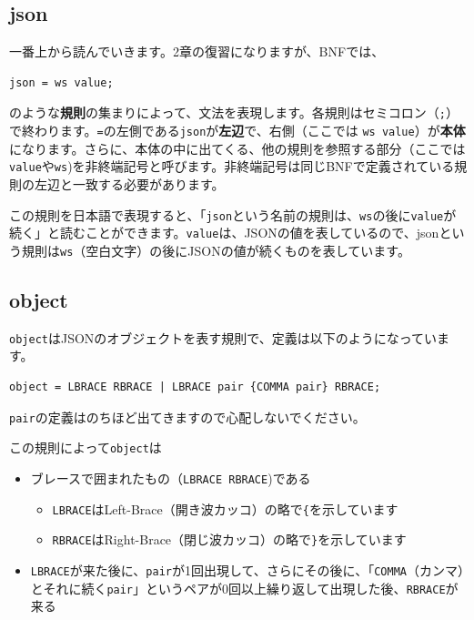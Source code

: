 \hypertarget{chapter3-json}{%
\subsection{json}\label{chapter3-json}}

一番上から読んでいきます。2章の復習になりますが、BNFでは、

\begin{verbatim}
json = ws value;
\end{verbatim}

のような\textbf{規則}の集まりによって、文法を表現します。各規則はセミコロン（\texttt{;}）で終わります。\texttt{=}の左側である\texttt{json}が\textbf{左辺}で、右側（ここでは
\texttt{ws\ value}）が\textbf{本体}になります。さらに、本体の中に出てくる、他の規則を参照する部分（ここでは\texttt{value}や\texttt{ws})を非終端記号と呼びます。非終端記号は同じBNFで定義されている規則の左辺と一致する必要があります。

この規則を日本語で表現すると、「\texttt{json}という名前の規則は、\texttt{ws}の後に\texttt{value}が続く」と読むことができます。\texttt{value}は、JSONの値を表しているので、jsonという規則は\texttt{ws}（空白文字）の後にJSONの値が続くものを表しています。

\hypertarget{chapter3-object}{%
\subsection{object}\label{chapter3-object}}

\texttt{object}はJSONのオブジェクトを表す規則で、定義は以下のようになっています。

\begin{verbatim}
object = LBRACE RBRACE | LBRACE pair {COMMA pair} RBRACE;
\end{verbatim}

\texttt{pair}の定義はのちほど出てきますので心配しないでください。

この規則によって\texttt{object}は

\begin{itemize}
\tightlist
\item
  ブレースで囲まれたもの（\texttt{LBRACE\ RBRACE})である

  \begin{itemize}
  \tightlist
  \item
    \texttt{LBRACE}はLeft-Brace（開き波カッコ）の略で\texttt{\{}を示しています
  \item
    \texttt{RBRACE}はRight-Brace（閉じ波カッコ）の略で\texttt{\}}を示しています
  \end{itemize}
\item
  \texttt{LBRACE}が来た後に、\texttt{pair}が1回出現して、さらにその後に、「\texttt{COMMA}（カンマ）とそれに続く\texttt{pair}」というペアが0回以上繰り返して出現した後、\texttt{RBRACE}が来る
\end{itemize}

